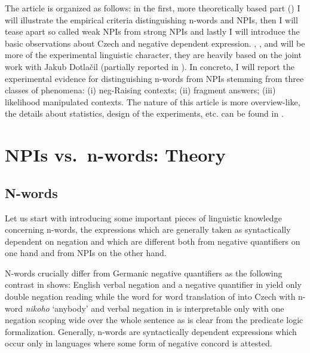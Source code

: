 \documentclass[output=paper,
]{langscibook}
\begin{document}
\noindent The article is organized as follows: in the first, more theoretically based part () I will illustrate the empirical criteria distinguishing n-words and NPIs, then I will tease apart so called weak NPIs from strong NPIs and lastly I will introduce the basic observations about Czech and negative dependent expression.  , , and  will be more of the experimental linguistic character, they are heavily based on the joint work with Jakub Dotlačil (partially reported in \citealt{dovcekal2016experimentala,docekaldotlacilsubedinb,docekaldotlacilsubber}). In concreto, I will report the experimental evidence for distinguishing n-words from NPIs stemming from three classes of phenomena: (i) neg-Raising contexts; (ii) fragment answers; (iii) likelihood manipulated contexts. The nature of this article is more overview-like, the details about statistics, design of the experiments, etc. can be found in \cite{dovcekal2016experimentala,docekaldotlacilsubedinb,docekaldotlacilsubber,docekalsafratovaoli}.

\section{NPIs vs.~n-words: Theory}\label{npis-vs.n-words-theory}

\subsection{N-words}\label{n-words}

Let us start with introducing some important pieces of linguistic knowledge concerning n-words, the expressions which are generally taken as syntactically dependent on negation and which are different both from negative quantifiers on one hand and from NPIs on the other hand.

N-words crucially differ from Germanic negative quantifiers as the following contrast in  shows: English verbal negation and a negative quantifier in  yield only double negation reading while the word for word translation of  into Czech with n-word \textit{nikoho} `anybody' and verbal negation in  is interpretable only with one negation scoping wide over the whole sentence as is clear from the predicate logic formalization. Generally, n-words are syntactically dependent expressions which occur only in languages where some form of negative concord is attested.
\end{document}
